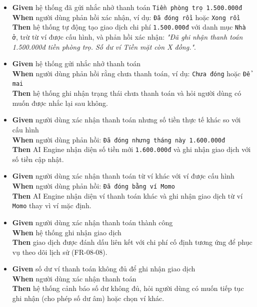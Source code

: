 \begin{itemize}
\item \textbf{Given} hệ thống đã gửi nhắc nhở thanh toán \texttt{Tiền phòng trọ 1.500.000đ}  \\ \hspace*{1.5em}  \textbf{When} người dùng phản hồi xác nhận, ví dụ: \texttt{Đã đóng rồi} hoặc \texttt{Xong rồi}  \\ \hspace*{1.5em}  \textbf{Then} hệ thống tự động tạo giao dịch chi phí \texttt{1.500.000đ} với danh mục \texttt{Nhà ở}, trừ từ ví được cấu hình, và phản hồi xác nhận: \textit{"Đã ghi nhận thanh toán 1.500.000đ tiền phòng trọ. Số dư ví Tiền mặt còn X đồng."}.
\item \textbf{Given} hệ thống gửi nhắc nhở thanh toán  \\ \hspace*{1.5em}  \textbf{When} người dùng phản hồi rằng chưa thanh toán, ví dụ: \texttt{Chưa đóng} hoặc \texttt{Để mai}  \\ \hspace*{1.5em}  \textbf{Then} hệ thống ghi nhận trạng thái chưa thanh toán và hỏi người dùng có muốn được nhắc lại sau không.
\item \textbf{Given} người dùng xác nhận thanh toán nhưng số tiền thực tế khác so với cấu hình  \\ \hspace*{1.5em}  \textbf{When} người dùng phản hồi: \texttt{Đã đóng nhưng tháng này 1.600.000đ}  \\ \hspace*{1.5em}  \textbf{Then} AI Engine nhận diện số tiền mới \texttt{1.600.000đ} và ghi nhận giao dịch với số tiền cập nhật.
\item \textbf{Given} người dùng xác nhận thanh toán từ ví khác với ví được cấu hình  \\ \hspace*{1.5em}  \textbf{When} người dùng phản hồi: \texttt{Đã đóng bằng ví Momo}  \\ \hspace*{1.5em}  \textbf{Then} AI Engine nhận diện ví thanh toán khác và ghi nhận giao dịch từ ví \texttt{Momo} thay vì ví mặc định.
\item \textbf{Given} người dùng xác nhận thanh toán thành công  \\ \hspace*{1.5em}  \textbf{When} hệ thống ghi nhận giao dịch  \\ \hspace*{1.5em}  \textbf{Then} giao dịch được đánh dấu liên kết với chi phí cố định tương ứng để phục vụ theo dõi lịch sử (FR-08-08).
\item \textbf{Given} số dư ví thanh toán không đủ để ghi nhận giao dịch  \\ \hspace*{1.5em}  \textbf{When} người dùng xác nhận thanh toán  \\ \hspace*{1.5em}  \textbf{Then} hệ thống cảnh báo số dư không đủ, hỏi người dùng có muốn tiếp tục ghi nhận (cho phép số dư âm) hoặc chọn ví khác.
\end{itemize}
